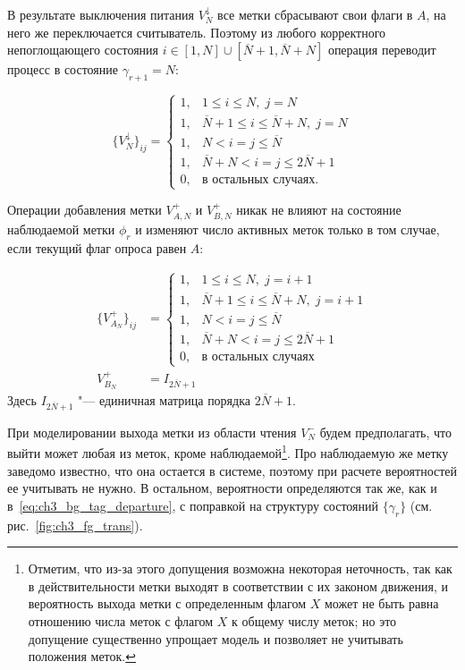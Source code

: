 В результате выключения питания $V_N^\downarrow$ все метки сбрасывают свои флаги в $A$, на него же переключается считыватель. Поэтому из любого корректного непоглощающего состояния $i \in [1, N] \cup [\overline{N}+1, \overline{N} + N]$ операция переводит процесс в состояние $\gamma_{r+1} = N$:

\begin{equation}\label{eq:ch3_fg_power_off}
	\{ V_N^\downarrow \}_{ij} = \begin{cases}
 		1, & 1 \leqslant i \leqslant N,\; j = N\\
 		1, & \overline{N}+1 \leqslant i \leqslant \overline{N} + N,\; j = N\\
 		1, & N < i = j \leqslant \overline{N}\\
 		1, & \overline{N} + N < i = j \leqslant 2\overline{N} + 1\\
 		0, & \text{в остальных случаях}.
 	\end{cases}
\end{equation}

Операции добавления метки $V_{A,N}^+$ и $V_{B,N}^+$ никак не влияют на состояние наблюдаемой метки $\phi_r$ и изменяют число активных меток только в том случае, если текущий флаг опроса равен $A$:

\begin{equation}\label{eq:ch3_fg_tag_arrival}
	\begin{aligned}
		\{ V_{A_N}^+ \}_{ij} &= \begin{cases}
 			1, & 1 \leqslant i \leqslant N,\; j = i + 1\\
 			1, & \overline{N}+1 \leqslant i \leqslant \overline{N} + N ,\; j = i + 1\\
	 		1, & N < i = j \leqslant \overline{N}\\
 			1, & \overline{N} + N < i = j \leqslant 2\overline{N} + 1\\
 			0, & \text{в остальных случаях}
	 	\end{cases}\\
	 	V_{B_N}^+ &= I_{2\overline{N}+1}
	\end{aligned}
\end{equation}
Здесь $I_{2\overline{N}+1}$ "--- единичная матрица порядка $2\overline{N}+1$.

При моделировании выхода метки из области чтения $V_N^-$ будем предполагать, что выйти может любая из меток, кроме наблюдаемой\footnote{Отметим, что из-за этого допущения возможна некоторая неточность, так как в действительности метки выходят в соответствии с их законом движения, и вероятность выхода метки с определенным флагом $X$ может не быть равна отношению числа меток с флагом $X$ к общему числу меток; но это допущение существенно упрощает модель и позволяет не учитывать положения меток.}. Про наблюдаемую же метку заведомо известно, что она остается в системе, поэтому при расчете вероятностей ее учитывать не нужно. В остальном, вероятности определяются так же, как и в~\eqref{eq:ch3_bg_tag_departure}, с поправкой на структуру состояний $\{ \gamma_r \}$ (см. рис.~\ref{fig:ch3_fg_trans}).

